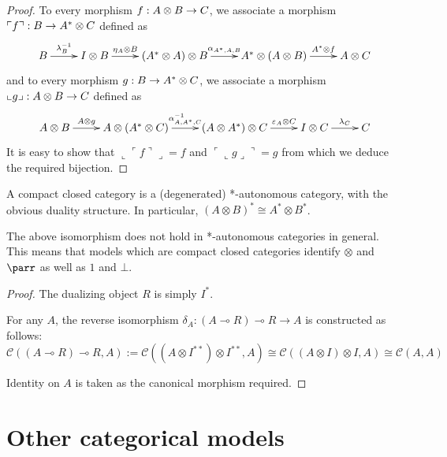 \begin{proof}
To every morphism $f:A\otimes B\to C$, we associate a morphism $\ulcorner f\urcorner:B\to A^*\otimes C$ defined as
\begin{equation*}
\xymatrix{
B\ar[r]^-{\lambda_B^{-1}}& I\tens B\ar[r]^-{\eta_A\tens B}& (A^*\tens A)\tens B\ar[r]^-{\alpha_{A^*,A,B}}& A^*\tens(A\tens B)\ar[r]^-{A^*\tens f}& A\tens C\\
}
\end{equation*}
and to every morphism $g:B\to A^*\otimes C$, we associate a morphism $\llcorner g\lrcorner:A\otimes B\to C$ defined as
\begin{equation*}
\xymatrix{
A\tens B\ar[r]^-{A\tens g}& A\tens(A^*\tens C)\ar[r]^-{\alpha_{A,A^*,C}^{-1}}& (A\tens A^*)\tens C\ar[r]^-{\varepsilon_A\tens C}& I\tens C\ar[r]^-{\lambda_C}& C
}
\end{equation*}
It is easy to show that $\llcorner \ulcorner f\urcorner\lrcorner=f$ and $\ulcorner\llcorner g\lrcorner\urcorner=g$ from which we deduce the required bijection.
\end{proof}

\begin{property}
A compact closed category is a (degenerated) *-autonomous category, with the obvious duality structure. In particular, $(A \otimes B)^* \cong A^*\otimes B^*$.
\end{property}

\begin{remark}
The above isomorphism does not hold in *-autonomous categories in general. This means that models which are compact closed categories identify $\otimes$ and $\parr$ as well as $1$ and $\bot$.
\end{remark}

\begin{proof}
The dualizing object $R$ is simply $I^*$.

For any $A$, the reverse isomorphism $\delta_A : (A \multimap R)\multimap R \rightarrow A$ is constructed as follows:
\begin{equation*}
\mathcal{C}((A \multimap R)\multimap R, A) := \mathcal{C}((A \otimes I^{**})\otimes I^{**}, A) \cong \mathcal{C}((A \otimes I)\otimes I, A) \cong \mathcal{C}(A, A)
\end{equation*}

Identity on $A$ is taken as the canonical morphism required.
\end{proof}


\section{Other categorical models}\label{other-categorical-models}

